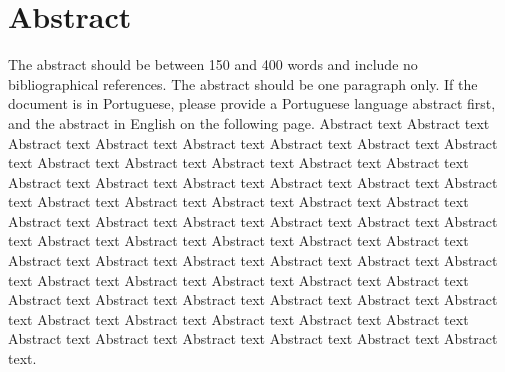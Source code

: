 \chapter*{Abstract}

The abstract should be between 150 and 400 words and include no bibliographical
references. The abstract should be one paragraph only. If the document is in Portuguese,
please provide a Portuguese language abstract first, and the abstract in English on the
following page. Abstract text Abstract text Abstract text Abstract text Abstract text Abstract
text Abstract text Abstract text Abstract text Abstract text Abstract text Abstract text
Abstract text Abstract text Abstract text Abstract text Abstract text Abstract text Abstract
text Abstract text Abstract text Abstract text Abstract text Abstract text Abstract text
Abstract text Abstract text Abstract text Abstract text Abstract text Abstract text Abstract
text Abstract text Abstract text Abstract text Abstract text Abstract text Abstract text
Abstract text Abstract text Abstract text Abstract text Abstract text Abstract text Abstract
text Abstract text Abstract text Abstract text Abstract text Abstract text Abstract text
Abstract text Abstract text Abstract text Abstract text Abstract text Abstract text Abstract
text Abstract text Abstract text Abstract text Abstract text Abstract text.

\imspagekeyws
